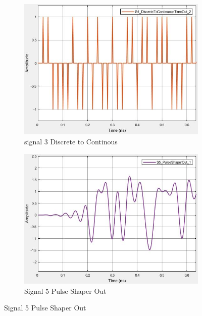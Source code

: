 \begin{figure}[H]
    \centering
    \begin{subfigure}{0.4\textwidth}
    	\includegraphics[scale=0.45]{../lib/m_qam_transmitter/figures/T_continuous_dirac.png}
    	\caption{signal 3 Discrete to Continous}
    	\label{fig:disc2Cont}
    \end{subfigure}
    \begin{subfigure}{0.4\textwidth}
    	\centering
    	\includegraphics[scale=0.45]{./lib/m_qam_transmitter/figures/T_raised_cossine.png}
    	\caption{Signal 5 Pulse Shaper Out}
    	\label{fig:pulse shape}
    \end{subfigure}
\end{figure}


